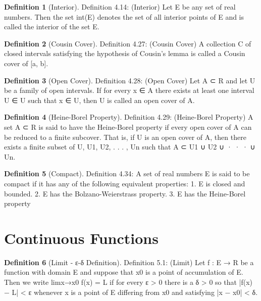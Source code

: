 \documentclass[11pt]{article}
\theoremstyle{definition}
\newtheorem{definition}{Definition}[section]
\begin{document}
\setcounter{definition}{13}
\begin{definition} [Interior]
	Definition 4.14: (Interior) Let E be any set of real numbers. Then the set
	int(E)
	denotes the set of all interior points of E and is called the interior of the set E.
\end{definition}

\setcounter{definition}{26}
\begin{definition} [Cousin Cover]
	Definition 4.27: (Cousin Cover) A collection C of closed intervals satisfying the hypothesis of Cousin’s
	lemma is called a Cousin cover of [a, b].
\end{definition}


\begin{definition} [Open Cover]
	Definition 4.28: (Open Cover) Let A ⊂ R and let U be a family of open intervals. If for every x ∈ A
	there exists at least one interval U ∈ U such that x ∈ U, then U is called an open cover of A.
\end{definition}


\begin{definition} [Heine-Borel Property]
	Definition 4.29: (Heine-Borel Property) A set A ⊂ R is said to have the Heine-Borel property if every
	open cover of A can be reduced to a finite subcover. That is, if U is an open cover of A, then there exists a
	finite subset of U, {U1, U2, . . . , Un} such that
	A ⊂ U1 ∪ U2 ∪ · · · ∪ Un.
\end{definition}

\setcounter{definition}{33}
\begin{definition} [Compact]
	Definition 4.34: A set of real numbers E is said to be compact if it has any of the following equivalent
	properties:
	1. E is closed and bounded.
	2. E has the Bolzano-Weierstrass property.
	3. E has the Heine-Borel property
\end{definition}

\section{Continuous Functions}

\begin{definition} [Limit - ε-δ Definition]
	Definition 5.1: (Limit) Let f : E → R be a function with domain E and suppose that x0 is a point of
	accumulation of E. Then we write
	limx→x0
	f(x) = L
	if for every ε > 0 there is a δ > 0 so that
	|f(x) − L| < ε
	whenever x is a point of E differing from x0 and satisfying |x − x0| < δ.
\end{definition}
\end{document}

